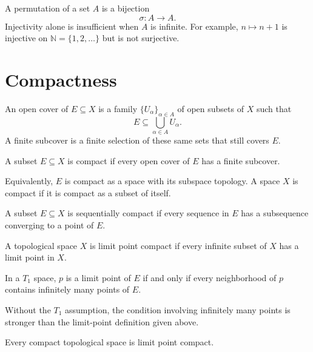 \documentclass[answers,12pt,addpoints]{exam}
\begin{document}
\begin{definition}[Permutation]
A permutation of a set $A$ is a bijection
\[
\sigma:A\longrightarrow A.
\]
Injectivity alone is insufficient when $A$ is infinite.
For example, $n\mapsto n+1$ is injective on
$\mathbb{N}=\{1,2,\ldots\}$ but is not surjective.
\end{definition}

\section{Compactness}

\begin{definition}
An open cover of $E\subseteq X$ is a family
$\{U_\alpha\}_{\alpha\in A}$ of open subsets of $X$ such that
\[
E\subseteq\bigcup_{\alpha\in A}U_\alpha.
\]
A finite subcover is a finite selection of these same sets
that still covers $E$.
\end{definition}

\begin{definition}
A subset $E\subseteq X$ is compact if every open cover of
$E$ has a finite subcover.

Equivalently, $E$ is compact as a space with its subspace
topology. A space $X$ is compact if it is compact as a
subset of itself.
\end{definition}

\begin{definition}
A subset $E\subseteq X$ is sequentially compact if every
sequence in $E$ has a subsequence converging to a point
of $E$.
\end{definition}

\begin{definition}
A topological space $X$ is limit point compact if every
infinite subset of $X$ has a limit point in $X$.
\end{definition}

\begin{remark}
In a $T_1$ space, $p$ is a limit point of $E$ if and only
if every neighborhood of $p$ contains infinitely many
points of $E$.

Without the $T_1$ assumption, the condition involving
infinitely many points is stronger than the limit-point
definition given above.
\end{remark}

\begin{theorem}
Every compact topological space is limit point compact.
\end{theorem}
\end{document}
